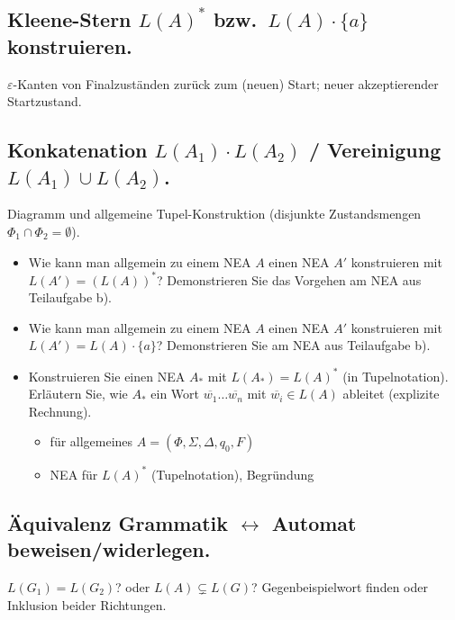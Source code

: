 \subsection{Kleene-Stern $L(A)^*$ bzw.\ $L(A)\cdot\{a\}$ konstruieren.} %
$\varepsilon$-Kanten von Finalzuständen zurück zum (neuen) Start; neuer akzeptierender Startzustand.

\subsection{Konkatenation $L(A_1)\cdot L(A_2)$ / Vereinigung $L(A_1)\cup L(A_2)$.}%
Diagramm und allgemeine Tupel-Konstruktion (disjunkte Zustandsmengen $\Phi_1\cap\Phi_2=\emptyset$).
\begin{itemize}
    \item Wie kann man allgemein zu einem NEA $A$ einen NEA $A'$ konstruieren mit $L(A')=(L(A))^*$?
    Demonstrieren Sie das Vorgehen am NEA aus Teilaufgabe b). 
    \item Wie kann man allgemein zu einem NEA $A$ einen NEA $A'$ konstruieren mit $L(A')=L(A)\cdot\{a\}$?
    Demonstrieren Sie am NEA aus Teilaufgabe b). 
    \item Konstruieren Sie einen NEA $A_*$ mit $L(A_*)=L(A)^*$ (in Tupelnotation).
    Erläutern Sie, wie $A_*$
    ein Wort $\overline{w_1}\dots\overline{w_n}$ mit $\overline{w_i}\in L(A)$ ableitet (explizite Rechnung).
    \begin{itemize}
        \item für allgemeines $A=(\Phi,\Sigma,\Delta,q_0,F)$ 
        \item NEA für $L(A)^*$ (Tupelnotation), Begründung 
    \end{itemize}
\end{itemize}


\subsection{Äquivalenz Grammatik $\leftrightarrow$ Automat beweisen/widerlegen.}%
$L(G_1)=L(G_2)$? oder $L(A)\subsetneq L(G)$? Gegenbeispielwort finden oder Inklusion beider Richtungen.

